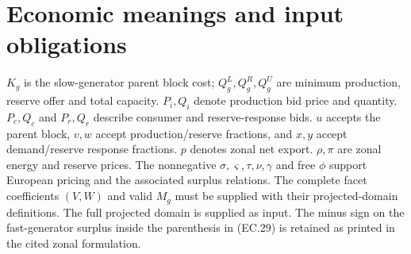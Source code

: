 \documentclass{article}
\begin{document}
\section*{Economic meanings and input obligations}
$K_g$ is the slow-generator parent block cost; $Q_g^L,Q_g^R,Q_g^U$ are
minimum production, reserve offer and total capacity. $P_i,Q_i$ denote production bid price and quantity.
$P_c,Q_c$ and $P_r,Q_r$ describe consumer and reserve-response bids.
$u$ accepts the parent block, $v,w$ accept production/reserve fractions, and $x,y$ accept demand/reserve response fractions.
$p$ denotes zonal net export. $\rho,\pi$ are zonal energy and reserve prices.
The nonnegative $\sigma,\varsigma,\tau,\nu,\gamma$ and free $\phi$ support European pricing and
the associated surplus relations. The complete facet coefficients $(V,W)$ and valid $M_g$ must
be supplied with their projected-domain definitions.
The full projected domain is supplied as input.
The minus sign on the fast-generator surplus inside the parenthesis in (EC.29)
is retained as printed in the cited zonal formulation.
\end{document}

